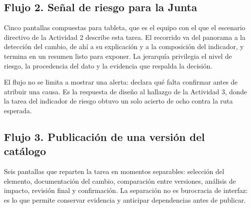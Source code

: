 

\clearpage
\subsection{Flujo 2. Señal de riesgo para la Junta}

Cinco pantallas compuestas para tableta, que es el equipo con el que el escenario directivo de la
Actividad 2 describe esta tarea. El recorrido va del panorama a la detección del cambio, de ahí a
su explicación y a la composición del indicador, y termina en un resumen listo para exponer. La
jerarquía privilegia el nivel de riesgo, la procedencia del dato y la evidencia que respalda la
decisión.

El flujo no se limita a mostrar una alerta: declara qué falta confirmar antes de atribuir una
causa. Es la respuesta de diseño al hallazgo de la Actividad 3, donde la tarea del indicador de
riesgo obtuvo un solo acierto de ocho contra la ruta esperada.



\clearpage

\clearpage
\subsection{Flujo 3. Publicación de una versión del catálogo}

Seis pantallas que reparten la tarea en momentos separables: selección del elemento, documentación
del cambio, comparación entre versiones, análisis de impacto, revisión final y confirmación. La
separación no es burocracia de interfaz: es lo que permite conservar evidencia y anticipar
dependencias antes de publicar.

